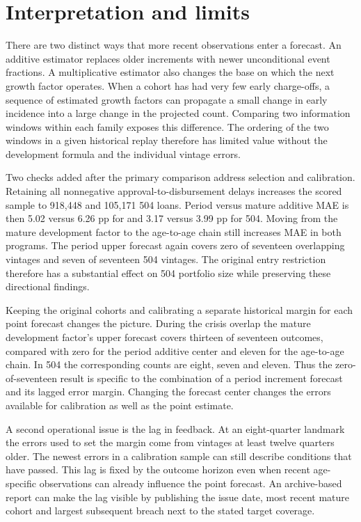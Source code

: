 \section{Interpretation and limits}
There are two distinct ways that more recent observations enter a forecast. An additive estimator replaces older increments with newer unconditional event fractions. A multiplicative estimator also changes the base on which the next growth factor operates. When a cohort has had very few early charge-offs, a sequence of estimated growth factors can propagate a small change in early incidence into a large change in the projected count. Comparing two information windows within each family exposes this difference. The ordering of the two windows in a given historical replay therefore has limited value without the development formula and the individual vintage errors.

Two checks added after the primary comparison address selection and calibration. Retaining all nonnegative approval-to-disbursement delays increases the scored sample to 918,448 \sba{} and 105,171 504 loans. Period versus mature additive MAE is then 5.02 versus 6.26 pp for \sba{} and 3.17 versus 3.99 pp for 504. Moving from the mature development factor to the age-to-age chain still increases MAE in both programs. The period upper forecast again covers zero of seventeen overlapping \sba{} vintages and seven of seventeen 504 vintages. The original entry restriction therefore has a substantial effect on 504 portfolio size while preserving these directional findings.

Keeping the original cohorts and calibrating a separate historical margin for each point forecast changes the picture. During the crisis overlap the mature development factor's upper forecast covers thirteen of seventeen \sba{} outcomes, compared with zero for the period additive center and eleven for the age-to-age chain. In 504 the corresponding counts are eight, seven and eleven. Thus the zero-of-seventeen result is specific to the combination of a period increment forecast and its lagged error margin. Changing the forecast center changes the errors available for calibration as well as the point estimate.

A second operational issue is the lag in feedback. At an eight-quarter landmark the errors used to set the margin come from vintages at least twelve quarters older. The newest errors in a calibration sample can still describe conditions that have passed. This lag is fixed by the outcome horizon even when recent age-specific observations can already influence the point forecast. An archive-based report can make the lag visible by publishing the issue date, most recent mature cohort and largest subsequent breach next to the stated target coverage.

